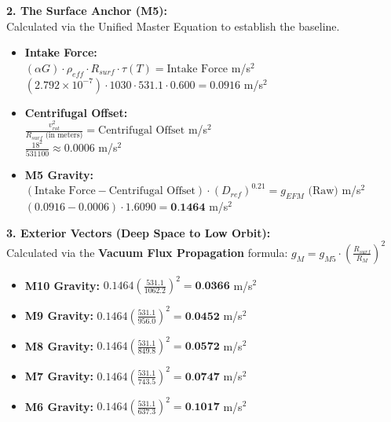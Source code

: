\documentclass[11pt, a4paper]{article}
\begin{document}
  \vspace{1.0em}
  \noindent \textbf{2. The Surface Anchor (M5):} \\
  \hspace*{1em} Calculated via the Unified Master Equation to establish the baseline.
  \begin{itemize}
    \item \textbf{Intake Force:} \\[0.5em]
    \hspace*{2em} $(\alpha G) \cdot \rho_{eff} \cdot R_{surf} \cdot \tau(T) = \text{Intake Force}$ m/s$^2$ \\[1em]
    \hspace*{2em} $(2.792 \times 10^{-7}) \cdot 1030 \cdot 531.1 \cdot 0.600 = 0.0916$ m/s$^2$
    
    \item \textbf{Centrifugal Offset:} \\[0.5em]
    \hspace*{2em} $\frac{v_{rot}^2}{R_{surf} \text{ (in meters)}} = \text{Centrifugal Offset}$ m/s$^2$ \\[1em]
    \hspace*{2em} $\frac{18^2}{531100} \approx 0.0006$ m/s$^2$
    
    \item \textbf{M5 Gravity:} \\[0.5em]
    \hspace*{2em} $(\text{Intake Force} - \text{Centrifugal Offset}) \cdot (D_{ref})^{0.21} = g_{EFM} \text{ (Raw)}$ m/s$^2$ \\[1em]
    \hspace*{2em} $(0.0916 - 0.0006) \cdot 1.6090 = \textbf{0.1464}$ m/s$^2$
  \end{itemize}

  \clearpage
  \noindent \textbf{3. Exterior Vectors (Deep Space to Low Orbit):} \\
  \hspace*{1em} Calculated via the \textbf{Vacuum Flux Propagation} formula: $g_M = g_{M5} \cdot \left( \frac{R_{surf}}{R_M} \right)^2$
  \begin{itemize}
    \item \textbf{M10 Gravity:} $0.1464 \left( \frac{531.1}{1062.2} \right)^2 = \textbf{0.0366}$ m/s$^2$
    \item \textbf{M9 Gravity:} $0.1464 \left( \frac{531.1}{956.0} \right)^2 = \textbf{0.0452}$ m/s$^2$
    \item \textbf{M8 Gravity:} $0.1464 \left( \frac{531.1}{849.8} \right)^2 = \textbf{0.0572}$ m/s$^2$
    \item \textbf{M7 Gravity:} $0.1464 \left( \frac{531.1}{743.5} \right)^2 = \textbf{0.0747}$ m/s$^2$
    \item \textbf{M6 Gravity:} $0.1464 \left( \frac{531.1}{637.3} \right)^2 = \textbf{0.1017}$ m/s$^2$
  \end{itemize}
\end{document}
